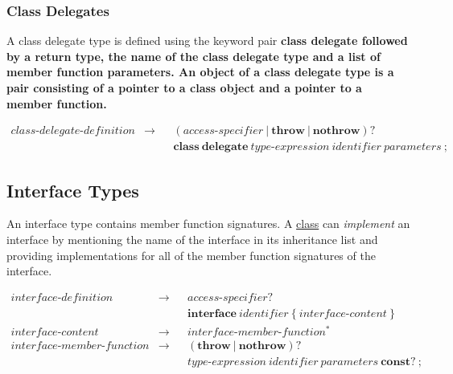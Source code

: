 \documentclass[a4paper,oneside,11pt]{article}
\begin{document}
\subsubsection{Class Delegates}\label{classdelegatedefinition}

A class delegate type is defined using the keyword pair \bf{class} \bf{delegate} followed by a return type, the name of the
class delegate type and a list of member function parameters.
An object of a class delegate type is a pair consisting of a pointer to a class object and a pointer to a member function.

\begin{align*}
class\textrm{-}delegate\textrm{-}definition &\rightarrow & &(\hyperref[accessspecifier]{access\textrm{-}specifier} \> | \> \textbf{throw} \> | \> \textbf{nothrow})?\\
& & &\textbf{class} \> \textbf{delegate} \> \hyperref[typeexpr]{type\textrm{-}expression} \> \hyperref[identifier]{identifier} \>
\hyperref[parameters]{parameters} \> \texttt{;}
\end{align*}

\subsection{Interface Types}\label{interface}

An interface type contains member function signatures.
A \hyperref[classtypes]{class} can \emph{implement} an interface by mentioning the name of the interface in its inheritance list and
providing implementations for all of the member function signatures of the interface.

\begin{align*}
interface\textrm{-}definition &\rightarrow & &\hyperref[accessspecifier]{access\textrm{-}specifier}?\\
& & &\textbf{interface} \> \hyperref[identifier]{identifier} \> \texttt{\{} \> interface\textrm{-}content \> \texttt{\}}\\
interface\textrm{-}content &\rightarrow & &interface\textrm{-}member\textrm{-}function^*\\
interface\textrm{-}member\textrm{-}function &\rightarrow & &(\textbf{throw} \> | \> \textbf{nothrow})?\\
& & &\hyperref[typeexpr]{type\textrm{-}expression} \> \hyperref[identifier]{identifier} \>
\hyperref[parameters]{parameters} \> \textbf{const}? \> \texttt{;}
\end{align*}

\clearpage
\end{document}
